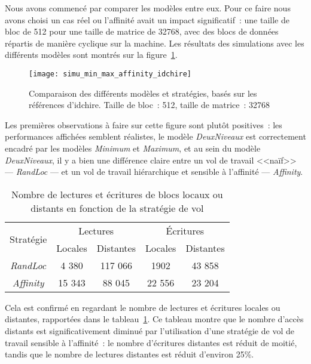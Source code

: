 Nous avons commencé par comparer les modèles entre eux.
Pour ce faire nous avons choisi un cas réel ou l'affinité avait un impact significatif~: une taille de bloc de 512 pour une taille de matrice de 32768, avec des blocs de données répartis de manière cyclique sur la machine.
Les résultats des simulations avec les différents modèles sont montrés sur la figure~\ref{fig:simu:modeles:idchire}.

\begin{figure}[h!]
  \centering
  \texttt{[image: simu\_min\_max\_affinity\_idchire]}
  \caption{Comparaison des différents modèles et stratégies, basés sur les références d'idchire. Taille de bloc~: 512, taille de matrice~: 32768}\label{fig:simu:modeles:idchire}
\end{figure}


Les premières observations à faire sur cette figure sont plutôt positives~: les performances affichées semblent réalistes, le modèle \emph{DeuxNiveaux} est correctement encadré par les modèles \emph{Minimum} et \emph{Maximum}, et au sein du modèle \emph{DeuxNiveaux}, il y a bien une différence claire entre un vol de travail <<naïf>> --- \emph{RandLoc} --- et un vol de travail hiérarchique et sensible à l'affinité --- \emph{Affinity}.

\begin{table}[h!]
\def\arraystretch{1.5}
\centering
\begin{tabular}{|c||c|c|c|c|}\hline
  \multirow{2}{*}{Stratégie} & \multicolumn{2}{c|}{Lectures} & \multicolumn{2}{c|}{Écritures} \\ \cline{2-5}
    & Locales & Distantes & Locales & Distantes \\
  \hline
  \emph{RandLoc} & 4 380 & 117 066 & 1902 & 43 858 \\
  \hline
  \emph{Affinity} & 15 343 & 88 045 & 22 556 & 23 204 \\
  \hline
\end{tabular}
\caption{Nombre de lectures et écritures de blocs locaux ou distants en fonction de la stratégie de vol}\label{tab:simu:acces-blocs-idchire}
\end{table}

Cela est confirmé en regardant le nombre de lectures et écritures locales ou distantes, rapportées dans le tableau~\ref{tab:simu:acces-blocs-idchire}.
Ce tableau montre que le nombre d'accès distants est significativement diminué par l'utilisation d'une stratégie de vol de travail sensible à l'affinité~: le nombre d'écritures distantes est réduit de moitié, tandis que le nombre de lectures distantes est réduit d'environ 25\%.


